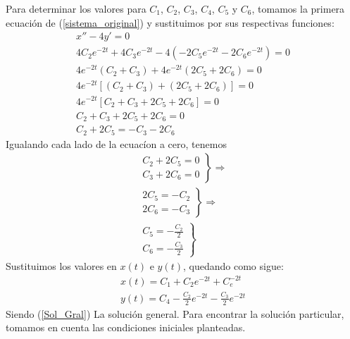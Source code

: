 \documentclass[12pt,spanish,lettersize]{article}
\begin{document}
Para determinar los valores para $C_1$, $C_2$, $C_3$, $C_4$, $C_5$ y $C_6$, tomamos la primera ecuaci\'on de (\ref{sistema_original}) y sustituimos por sus respectivas funciones:
\begin{eqnarray}
\nonumber x''-4y'=0 \\
\nonumber 4C_2e^{-2t}+4C_3e^{-2t}-4(-2C_5e^{-2t}-2C_6e^{-2t})=0 \\
\nonumber 4e^{-2t}(C_2+C_3)+4e^{-2t}(2C_5+2C_6)=0 \\
\nonumber 4e^{-2t}[(C_2+C_3)+(2C_5+2C_6)]=0 \\
\nonumber 4e^{-2t}[C_2+C_3+2C_5+2C_6]=0 \\
\nonumber C_2+C_3+2C_5+2C_6=0 \\
C_2+2C_5=-C_3-2C_6
\end{eqnarray}
Igualando cada lado de la ecuac\'ion a cero, tenemos
\begin{eqnarray}
\left.
\begin{array}{l}
C_2+2C_5=0\\
C_3+2C_6=0
\end{array}
\right\rbrace\Rightarrow\\
\nonumber \left.
\begin{array}{l}
2C_5=-C_2\\
2C_6=-C_3
\end{array}
\right\rbrace\Rightarrow\\
\left.
\begin{array}{l}
C_5=-\frac{C_2}{2}\\
C_6=-\frac{C_3}{2}
\end{array}
\right\rbrace
\end{eqnarray}
Sustituimos los valores en $x(t)$ e $y(t)$, quedando como sigue:
\begin{eqnarray}
x(t)=C_1+C_2e^{-2t}+C_e^{-2t}\\
\label{Sol_Gral}y(t)=C_4-\frac{C_2}{2}e^{-2t}-\frac{C_3}{2}e^{-2t}
\end{eqnarray}
Siendo (\ref{Sol_Gral}) La soluci\'on general. Para encontrar la soluci\'on particular, tomamos en cuenta las condiciones iniciales planteadas.
\end{document}
